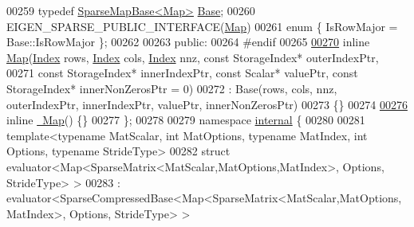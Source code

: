 \begin{DoxyCode}
00259     \textcolor{keyword}{typedef} \hyperlink{class_eigen_1_1_sparse_map_base}{SparseMapBase<Map>} \hyperlink{class_eigen_1_1_sparse_map_base}{Base};
00260     EIGEN\_SPARSE\_PUBLIC\_INTERFACE(\hyperlink{group___core___module_class_eigen_1_1_map}{Map})
00261     \textcolor{keyword}{enum} \{ IsRowMajor = Base::IsRowMajor \};
00262 
00263   \textcolor{keyword}{public}:
00264 \textcolor{preprocessor}{#endif}
00265 
\hyperlink{class_eigen_1_1_map_3_01const_01_sparse_matrix_3_01_mat_scalar_00_01_mat_options_00_01_mat_index4032bba20cf92aab8bcf07e926e15a4f_a8075e61ba51d1aa5858b0163e80eca8b}{00270}     \textcolor{keyword}{inline} \hyperlink{class_eigen_1_1_map_3_01const_01_sparse_matrix_3_01_mat_scalar_00_01_mat_options_00_01_mat_index4032bba20cf92aab8bcf07e926e15a4f_a8075e61ba51d1aa5858b0163e80eca8b}{Map}(\hyperlink{namespace_eigen_a62e77e0933482dafde8fe197d9a2cfde}{Index} rows, \hyperlink{namespace_eigen_a62e77e0933482dafde8fe197d9a2cfde}{Index} cols, \hyperlink{namespace_eigen_a62e77e0933482dafde8fe197d9a2cfde}{Index} nnz, \textcolor{keyword}{const} StorageIndex* outerIndexPtr,
00271                \textcolor{keyword}{const} StorageIndex* innerIndexPtr, \textcolor{keyword}{const} Scalar* valuePtr, \textcolor{keyword}{const} StorageIndex* 
      innerNonZerosPtr = 0)
00272       : Base(rows, cols, nnz, outerIndexPtr, innerIndexPtr, valuePtr, innerNonZerosPtr)
00273     \{\}
00274 
\hyperlink{class_eigen_1_1_map_3_01const_01_sparse_matrix_3_01_mat_scalar_00_01_mat_options_00_01_mat_index4032bba20cf92aab8bcf07e926e15a4f_aa4b0d0dd528fef0e1f8ce8c043d42b21}{00276}     \textcolor{keyword}{inline} \hyperlink{class_eigen_1_1_map_3_01const_01_sparse_matrix_3_01_mat_scalar_00_01_mat_options_00_01_mat_index4032bba20cf92aab8bcf07e926e15a4f_aa4b0d0dd528fef0e1f8ce8c043d42b21}{~Map}() \{\}
00277 \};
00278 
00279 \textcolor{keyword}{namespace }\hyperlink{namespaceinternal}{internal} \{
00280 
00281 \textcolor{keyword}{template}<\textcolor{keyword}{typename} MatScalar, \textcolor{keywordtype}{int} MatOptions, \textcolor{keyword}{typename} MatIndex, \textcolor{keywordtype}{int} Options, \textcolor{keyword}{typename} Str\textcolor{keywordtype}{id}eType>
00282 \textcolor{keyword}{struct }evaluator<Map<SparseMatrix<MatScalar,MatOptions,MatIndex>, Options, StrideType> >
00283   : evaluator<SparseCompressedBase<Map<SparseMatrix<MatScalar,MatOptions,MatIndex>, Options, StrideType> > 

\end{DoxyCode}
